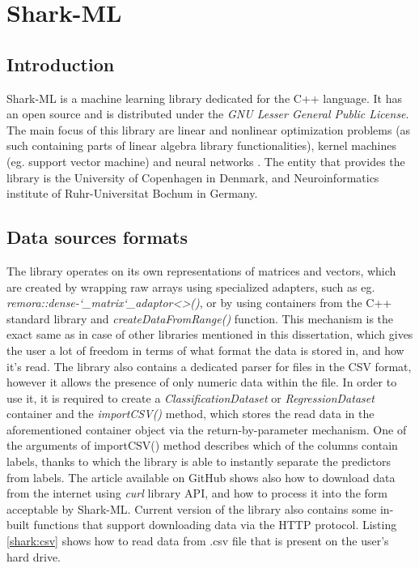 \chapter{Shark-ML}

\section{Introduction}

Shark-ML is a machine learning library dedicated for the C++ language. It has an open source and is distributed under the \textit{GNU Lesser General Public License}. The main focus of this library are linear and nonlinear optimization problems (as such containing parts of linear algebra library functionalities), kernel machines (eg. support vector machine) and neural networks \cite{shark}. The entity that provides the library is the University of Copenhagen in Denmark, and Neuroinformatics institute of Ruhr-Universitat Bochum in Germany. 

\section{Data sources formats}

The library operates on its own representations of matrices and vectors, which are created by wrapping raw arrays using specialized adapters, such as eg. \textit{remora::dense-\char`_matrix\char`_adaptor<>()}, or by using containers from the C++ standard library and \textit{createDataFromRange()} function. This mechanism is the exact same as in case of other libraries mentioned in this dissertation, which gives the user a lot of freedom in terms of what format the data is stored in, and how it's read. The library also contains a dedicated parser for files in the CSV format, however it allows the presence of only numeric data within the file. In order to use it, it is required to create a \textit{ClassificationDataset} or \textit{RegressionDataset} container and the \textit{importCSV()} method, which stores the read data in the aforementioned container object via the return-by-parameter mechanism. One of the arguments of importCSV() method describes which of the columns contain labels, thanks to which the library is able to instantly separate the predictors from labels. The article \cite{shark:http} available on GitHub shows also how to download data from the internet using \textit{curl} library API, and how to process it into the form acceptable by Shark-ML. Current version of the library also contains some in-built functions that support downloading data via the HTTP protocol. Listing \ref{shark:csv} shows how to read data from .csv file that is present on the user's hard drive.

